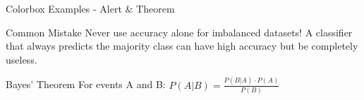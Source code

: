 \documentclass[usenames,dvipsnames]{beamer}
\begin{document}
\begin{frame}{Colorbox Examples - Alert \& Theorem}
\begin{alertbox}{Common Mistake}
Never use accuracy alone for imbalanced datasets! A classifier that always predicts the majority class can have high accuracy but be completely useless.
\end{alertbox}

\vspace{0.5cm}

\begin{theorembox}{Bayes' Theorem}
For events A and B: $P(A|B) = \frac{P(B|A) \cdot P(A)}{P(B)}$
\end{theorembox}
\end{frame}
\end{document}
